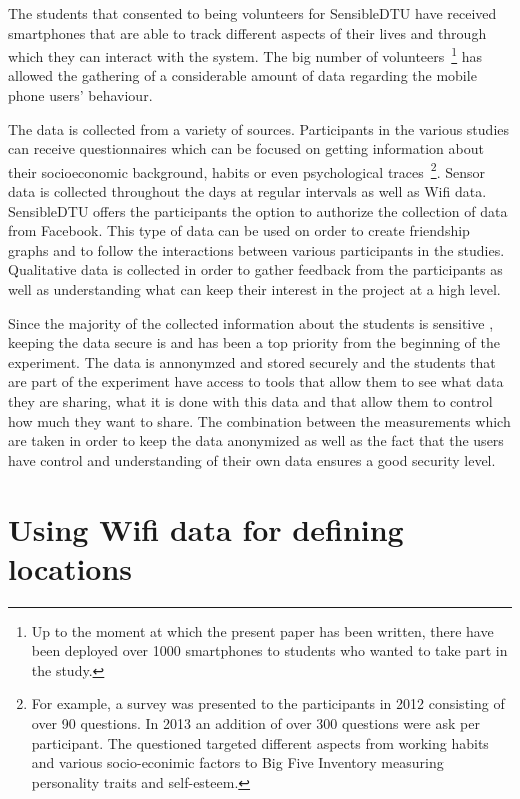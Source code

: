 The students that consented to being volunteers for SensibleDTU have received
smartphones that are able to track different aspects of their lives and through
which they can interact with the system. The big number of
volunteers~\footnote{Up to the moment at which the present paper has been
written, there have been deployed over 1000 smartphones to students who wanted
to take part in the study.} has allowed the gathering of a considerable amount
of data regarding the mobile phone users' behaviour. 

The data is collected from a variety of sources. Participants in the various
studies can receive questionnaires which can be focused on getting information
about their socioeconomic background, habits or even psychological
traces~\footnote{For example, a survey was presented to the participants in 2012
consisting of over 90 questions. In 2013 an addition of over 300 questions were
ask per participant. The questioned targeted different aspects from working
habits and various socio-econimic factors to Big Five Inventory measuring
personality traits \cite{John99} and self-esteem.}. Sensor data is collected
throughout the days at regular intervals as well as Wifi data. SensibleDTU
offers the participants the option to authorize the collection of data from
Facebook. This type of data can be used on order to create friendship graphs and
to follow the interactions between various participants in the studies.
Qualitative data is collected in order to gather feedback from the participants
as well as understanding what can keep their interest in the project at a high
level.

Since the majority of the collected information about the students is sensitive
\cite{Stopczynski14p}, keeping the data secure is and has been a top priority
from the beginning of the experiment. The data is annonymzed and stored securely
and the students that are part of the experiment have access to tools that allow
them to see what data they are sharing, what it is done with this data and that
allow them to control how much they want to share. The combination between the
measurements which are taken in order to keep the data anonymized as well as the
fact that the users have control and understanding of their own data ensures a
good security level.


\section{Using Wifi data for defining locations}

